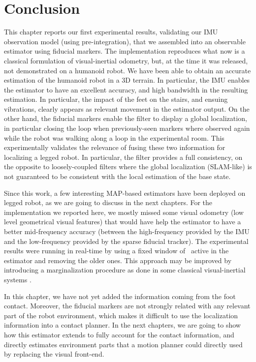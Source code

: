 \section{Conclusion}

This chapter reports our first experimental results, validating our IMU observation model (using pre-integration), that we assembled into an observable 
estimator using fiducial markers. The implementation reproduces what now is a classical formulation of visual-inertial odometry, but, at the time it was 
released, not demonstrated on a humanoid robot. We have been able to obtain an accurate estimation of the humanoid robot  in a 3D terrain. In particular, 
the IMU enables the estimator to have an excellent accuracy, and high bandwidth in the resulting estimation. In particular, the impact of the feet on the stairs, 
and ensuing vibrations, clearly appears as relevant movement in the estimator output. On the other hand, the fiducial markers enable the filter to display 
a global localization, in particular closing the loop when previously-seen markers where observed again while the 
robot was walking along a loop in the experimental room. This experimentally validates the relevance of fusing these two 
information for localizing a legged robot. In particular, the filter provides a full consistency, on the opposite to loosely-coupled 
filters where the global localization (SLAM-like) is not guaranteed to be consistent with the local estimation of the base state. 

Since this work, a few interesting MAP-based estimators have been deployed on legged robot, as we are going to discuss in the next chapters. 
For the implementation we reported here, we mostly missed some visual odometry (\ie low level geometrical visual features) that would have help the estimator 
to have a better mid-frequency accuracy (between the high-frequency provided by the IMU and the low-frequency provided by the sparse fiducial tracker).
The experimental results were running in real-time by using a fixed window of \keyframes\ active in the estimator and removing the older ones. This
approach may be improved by introducing a marginalization procedure as done in some classical visual-inertial systems \cite{leutenegger2015keyframe}.

In this chapter, we have not yet added the information coming from the foot contact. Moreover, the fiducial markers are not strongly related with any 
relevant part of the robot environment, which makes it difficult to use the localization information into a contact planner. In the next chapters, we are going to show 
how this estimator extends to fully account for the contact information, and directly estimates environment parts that a motion planner could directly used by replacing
the visual front-end.